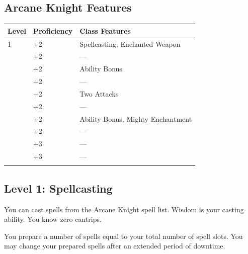 \documentclass[12pt,letterpaper,twocolumn,openany,nodeprecatedcode,bg=none]{dndbook}
\let\oldsubsection\subsection
\renewcommand{\subsection}[1]{%
  \needspace{5\baselineskip}%
  \oldsubsection{#1}%
}
\begin{document}
\subsection{Arcane Knight Features}\label{arcane-knight-features}


{\def\LTcaptype{none} %
\begin{table}[!htbp]
\centering
\begin{tabular}{@{}
  >{\raggedright\arraybackslash}p{}
  >{\raggedright\arraybackslash}p{}
  >{\raggedright\arraybackslash}p{}@{}}
\toprule\noalign{}
\begin{minipage}[b]{\linewidth}\raggedright
Level
\end{minipage} & \begin{minipage}[b]{\linewidth}\raggedright
Proficiency
\end{minipage} & \begin{minipage}[b]{\linewidth}\raggedright
Class Features
\end{minipage} \\
\midrule\noalign{}
1 & +2 & Spellcasting, Enchanted Weapon \\
2 & +2 & --- \\
3 & +2 & Ability Bonus \\
4 & +2 & --- \\
5 & +2 & Two Attacks \\
6 & +2 & --- \\
7 & +2 & Ability Bonus, Mighty Enchantment \\
8 & +2 & --- \\
9 & +3 & --- \\
10 & +3 & --- \\
\bottomrule\noalign{}
\end{tabular}
\end{table}
}

\subsection{Level 1: Spellcasting}\label{level-1-spellcasting}

You can cast spells from the Arcane Knight spell list. Wisdom is your
casting ability. You know zero cantrips.

You prepare a number of spells equal to your total number of spell
slots. You may change your prepared spells after an extended period of
downtime.
\end{document}
